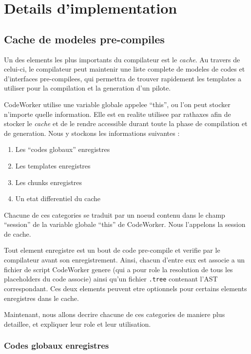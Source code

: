 \documentclass[french]{rtxreport}
\begin{document}
\chapter{Details d'implementation}



\section{Cache de modeles pre-compiles}

Un des elements les plus importants du compilateur est le \emph{cache}. Au
travers de celui-ci, le compilateur peut maintenir une liste complete de
modeles de codes et d'interfaces pre-compilees, qui permettra de trouver
rapidement les templates a utiliser pour la compilation et la generation d'un
pilote.

CodeWorker utilise une variable globale appelee ``this'', ou l'on peut stocker
n'importe quelle information. Elle est en realite utilisee par rathaxes afin de
stocker le \emph{cache} et de le rendre accessible durant toute la phase de
compilation et de generation. Nous y stockons les informations suivantes :
\begin{enumerate}
    \item Les ``codes globaux'' enregistres
    \item Les templates enregistres
    \item Les chunks enregistres
    \item Un etat differentiel du cache
\end{enumerate}

Chacune de ces categories se traduit par un noeud contenu dans le champ
``session'' de la variable globale ``this'' de CodeWorker. Nous l'appelons la
session de cache.

Tout element enregistre est un bout de code pre-compile et verifie par le
compilateur avant son enregistrement. Ainsi, chacun d'entre eux est associe a
un fichier de script CodeWorker genere (qui a pour role la resolution de tous
les placeholders du code associe) ainsi qu'un fichier \texttt{.tree} contenant
l'AST correspondant. Ces deux elements peuvent etre optionnels pour certains
elements enregistres dans le cache.

Maintenant, nous allons decrire chacune de ces categories de maniere plus
detaillee, et expliquer leur role et leur utilisation.


\subsection{Codes globaux enregistres}
\end{document}
